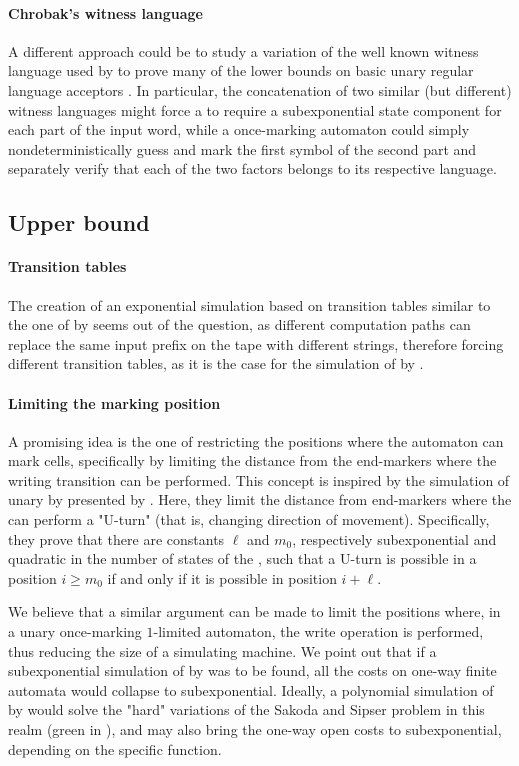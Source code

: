 \paragraph{Chrobak's witness language} A different approach could be to study a variation of the well known witness language used by \citeauthor{Chr86} to prove many of the lower bounds on basic unary regular language acceptors \cite{Chr86}.
In particular, the concatenation of two similar (but different) witness languages might force a \ODFA to require a subexponential state component for each part of the input word, while a once-marking automaton could simply nondeterministically guess and mark the first symbol of the second part and separately verify that each of the two factors belongs to its respective language.


\subsection{Upper bound}

\paragraph{Transition tables} The creation of an exponential simulation based on transition tables similar to the one of \TNFA by \ODFA seems out of the question, as different computation paths can replace the same input prefix on the tape with different strings, therefore forcing different transition tables, as it is the case for the simulation of \OLA by \ODFA.

\paragraph{Limiting the marking position} A promising idea is the one of restricting the positions where the automaton can mark cells, specifically by limiting the distance from the end-markers where the writing transition can be performed.
This concept is inspired by the simulation of unary \TNFA by \ODFA presented by .
Here, they limit the distance from end-markers where the \TNFA can perform a "U-turn" (that is, changing direction of movement).
Specifically, they prove that there are constants $\ell$ and $m_0$, respectively subexponential and quadratic in the number of states of the \TNFA, such that a U-turn is possible in a position $i\ge m_0$ if and only if it is possible in position $i+\ell$.

We believe that a similar argument can be made to limit the positions where, in a unary once-marking $1$-limited automaton, the write operation is performed, thus reducing the size of a simulating machine.
We point out that if a subexponential simulation of \OMOLA by \ODFA was to be found, all the costs on one-way finite automata would collapse to subexponential.
Ideally, a polynomial simulation of \OMOLA by \TDFA would solve the "hard" variations of the Sakoda and Sipser problem in this realm (green in ), and may also bring the one-way open costs to subexponential, depending on the specific function.
